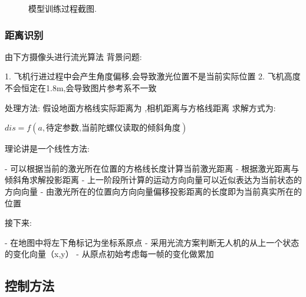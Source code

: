 \documentclass[12pt, a4paper, oneside]{article}
\begin{document}
\begin{figure}[H]
    \centering
    \caption{模型训练过程截图.}
\end{figure}

\subsubsection{距离识别}

由下⽅摄像头进⾏流光算法
背景问题:

1. ⻜机⾏进过程中会产⽣⻆度偏移,会导致激光位置不是当前实际位置
2. ⻜机⾼度不会恒定在1.8m,会导致图⽚参考系不⼀致

处理⽅法:
假设地⾯⽅格线实际距离为 ,相机距离与⽅格线距离 求解⽅式为:

$dis=f(a,\text{待定参数,当前陀螺仪读取的倾斜角度})$

理论讲是⼀个线性⽅法:

- 可以根据当前的激光所在位置的⽅格线⻓度计算当前激光距离
- 根据激光距离与倾斜⻆求解投影距离
- 上⼀阶段所计算的运动⽅向向量可以近似表达为当前状态的⽅向向量
- 由激光所在的位置向⽅向向量偏移投影距离的⻓度即为当前真实所在的位置

接下来:

- 在地图中将左下⻆标记为坐标系原点
- 采⽤光流⽅案判断⽆⼈机的从上⼀个状态的变化向量（x,y）
- 从原点初始考虑每⼀帧的变化做累加

\subsection{控制方法}
\end{document}
